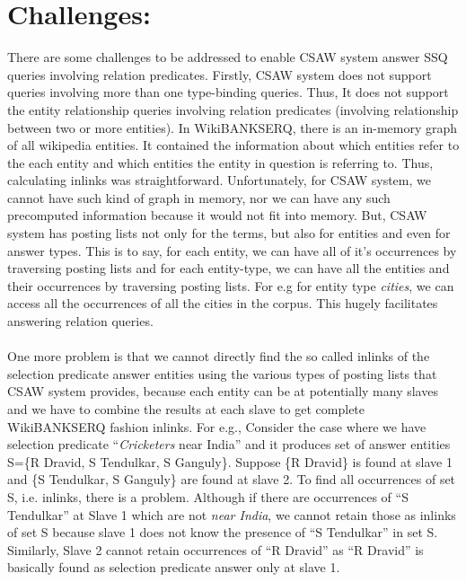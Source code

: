 \documentclass[11pt]{report}
\begin{document}
\section{Challenges:}
There are some challenges to be addressed to enable CSAW system answer SSQ queries involving relation predicates. Firstly, CSAW system does not support 
queries involving more than one type-binding queries. Thus, It does not support the entity relationship queries involving relation predicates (involving relationship 
between two or more entities). In WikiBANKSERQ, there is an in-memory graph of all wikipedia entities. It contained the information about
which entities refer to the each entity and which entities the entity in question is referring to. Thus, calculating inlinks was straightforward.
Unfortunately, for CSAW system, we cannot have such kind of graph in memory, nor we can have any such precomputed information because it would not fit into memory.
But, CSAW system has posting lists not only for the terms, but also for entities and even for answer types. This is to say, for each entity, we can have  all of it's
occurrences by traversing posting lists and for each entity-type, we can have all the entities and their occurrences by traversing posting lists. For e.g for
entity type \textit{cities}, we can access all the occurrences of all the cities in the corpus. This hugely facilitates answering relation queries.
\paragraph*{}
One more problem is that we cannot directly find the so called inlinks of the selection predicate answer entities using
the various types of posting lists that CSAW system provides, because each entity can be at potentially many slaves and we have to combine the results at each slave to get
complete WikiBANKSERQ \cite{wikibanks} fashion inlinks. For e.g., Consider the case where we have selection predicate ``\textit{Cricketers} near India'' and it 
produces set of answer entities S=\{R Dravid, S Tendulkar, S Ganguly\}. Suppose \{R Dravid\} is found at slave 1 and \{S Tendulkar, S Ganguly\} are found at slave 2.
To find all occurrences of set S, i.e. inlinks, there is a problem. Although if there are occurrences of ``S Tendulkar'' at Slave 1 which are not \textit{near India},
we cannot retain those as inlinks of set S because slave 1 does not know the presence of ``S Tendulkar'' in set S. Similarly, Slave 2 cannot retain occurrences 
of ``R Dravid'' as ``R Dravid'' is basically found as selection predicate answer only at slave 1.
\end{document}

